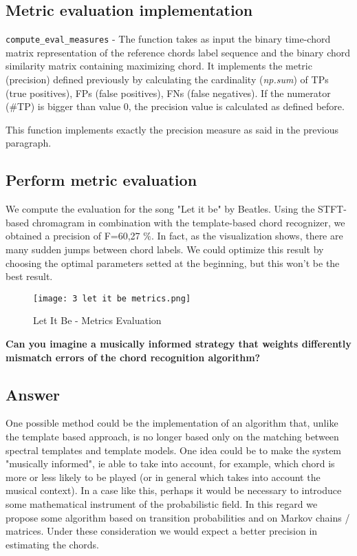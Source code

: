 \documentclass{article}
\begin{document}
\subsection*{Metric evaluation implementation}

\verb|compute_eval_measures| -  The function takes as input the binary time-chord matrix representation of the reference chords label sequence and the binary chord similarity matrix containing maximizing chord.
It implements the metric (precision) defined previously by calculating the cardinality (\textit{np.sum}) of TPs (true positives), FPs (false positives), FNs (false negatives). If the numerator (#TP) is bigger than value 0, the precision value is calculated as defined before.


This function implements exactly the precision measure as said in the previous paragraph.

\subsection*{Perform metric evaluation}

We compute the evaluation for the song "Let it be" by Beatles.
Using the STFT-based chromagram in combination with the template-based chord recognizer, we obtained a precision of F=60,27 \begin{math}\% \end{math}. In fact, as the visualization shows, there are many sudden jumps between chord labels. We could optimize this result by choosing the optimal parameters setted at the beginning, but this won't be the best result.


\begin{figure}[H]
 \centering
 \texttt{[image: 3 let it be metrics.png]}
 \caption{Let It Be - Metrics Evaluation}
\end{figure}

\begin{problem}
	\textbf{Can you imagine a musically informed strategy that weights differently mismatch errors of
the chord recognition algorithm?}
\end{problem}

\subsection*{\color{blue}Answer}

One possible method could be the implementation of an algorithm that, unlike the template based approach, is no longer based only on the matching between spectral templates and template models. One idea could be to make the system "musically informed", ie able to take into account, for example, which chord is more or less likely to be played (or in general which takes into account the musical context). In a case like this, perhaps it would be necessary to introduce some mathematical instrument of the probabilistic field. In this regard we propose some algorithm based on transition probabilities and on Markov chains / matrices. Under these consideration we would expect a better precision in estimating the chords.
\end{document}
